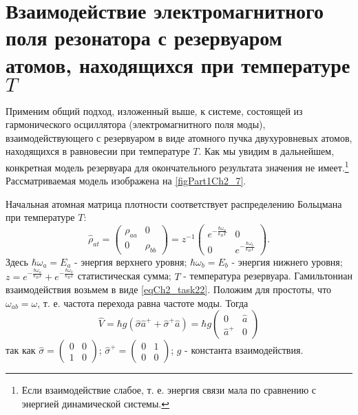 \section{Взаимодействие электромагнитного поля резонатора
  с резервуаром атомов, находящихся при
  температуре $T$}
\label{ch2_6}
Применим общий подход, изложенный выше, к системе, состоящей из
гармонического осциллятора (электромагнитного поля моды),
взаимодействующего с резервуаром в виде атомного пучка двухуровневых
атомов, находящихся в равновесии при температуре $T$.  Как мы увидим
в дальнейшем, конкретная модель резервуара для окончательного
результата значения не имеет.\footnote{Если взаимодействие слабое,
  т. е. энергия связи мала по сравнению с энергией динамической системы.} 
Рассматриваемая модель изображена на
\autoref{figPart1Ch2_7}.  



Начальная атомная матрица плотности соответствует распределению
Больцмана при температуре $T$:  
\begin{equation}
\hat{\rho}_{at} = 
\left(
\begin{array} {cc}
\rho_{aa} & 0  
\\
0 & \rho_{bb} 
\end{array}
\right)
=
z^{-1}
\left(
\begin{array} {cc}
e^{-\frac{\hbar \omega_a}{k_B T}} & 0  
\\
0 & e^{-\frac{\hbar \omega_b}{k_B T}} 
\end{array}
\right).
\end{equation}
Здесь $\hbar \omega_a = E_a$ - энергия верхнего уровня;  
$\hbar \omega_b = E_b$ - энергия нижнего уровня; 
$z = e^{-\frac{\hbar \omega_a}{k_B T}} + e^{-\frac{\hbar \omega_b}{k_B
    T}}$ статистическая сумма; $T$ - температура резервуара. 
Гамильтониан взаимодействия возьмем в виде
\eqref{eqCh2_task22}. Положим для простоты, 
что $\omega_{ab} = \omega$,  т. е. частота перехода равна частоте 
моды. Тогда  
\begin{equation}
\hat{V} = \hbar g \left(\hat{\sigma}\hat{a}^{+} + 
\hat{\sigma}^{+}\hat{a} \right)= 
\hbar g 
\left(
\begin{array} {cc}
0 & \hat{a}  
\\
\hat{a}^{+} & 0 
\end{array}
\right)
\end{equation}
так как  
\(
\hat{\sigma} = 
\left(
\begin{array} {cc}
0 & 0  
\\
1 & 0 
\end{array}
\right)
\);
\(
\hat{\sigma}^{+} = 
\left(
\begin{array} {cc}
0 & 1  
\\
0 & 0 
\end{array}
\right)
\); $g$ - константа взаимодействия. 

